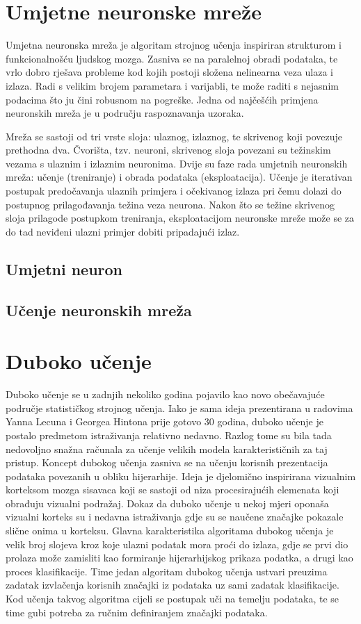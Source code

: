 \documentclass[lmodern, utf8, diplomski, numeric]{fer}
\begin{document}
  

\chapter{Umjetne neuronske mreže}

Umjetna neuronska mreža je algoritam strojnog učenja inspiriran strukturom i funkcionalnošću ljudskog mozga. Zasniva se na paralelnoj obradi podataka, te vrlo dobro rješava probleme kod kojih postoji složena nelinearna veza ulaza i izlaza. Radi s velikim brojem parametara i varijabli, te može raditi s nejasnim podacima što ju čini robusnom na pogreške. Jedna od najčešćih primjena neuronskih mreža je u području raspoznavanja uzoraka.

Mreža se sastoji od tri vrste sloja: ulaznog, izlaznog, te skrivenog koji povezuje prethodna dva. Čvorišta, tzv. neuroni, skrivenog sloja povezani su težinskim vezama s ulaznim i izlaznim neuronima. Dvije su faze rada umjetnih neuronskih mreža: učenje (treniranje) i obrada podataka (eksploatacija). Učenje je iterativan postupak predočavanja ulaznih primjera i očekivanog izlaza pri čemu dolazi do postupnog prilagođavanja težina veza neurona. Nakon što se težine skrivenog sloja prilagode postupkom treniranja, eksploatacijom neuronske mreže može se za do tad neviđeni ulazni primjer dobiti pripadajući izlaz.

\section{Umjetni neuron}
\section{Učenje neuronskih mreža}


\chapter{Duboko učenje}

Duboko učenje se u zadnjih nekoliko godina pojavilo kao novo obečavajuće područje statističkog strojnog učenja. Iako je sama ideja prezentirana u radovima Yanna Lecuna i Georgea Hintona prije gotovo 30 godina, duboko učenje je postalo predmetom istraživanja relativno nedavno. Razlog tome su bila tada nedovoljno snažna računala za učenje velikih modela karakterističnih za taj pristup. Koncept dubokog učenja zasniva se na učenju korisnih prezentacija podataka povezanih u obliku hijerarhije. Ideja je djelomično inspirirana vizualnim korteksom mozga sisavaca koji se sastoji od niza procesirajućih elemenata koji obrađuju vizualni podražaj. Dokaz da duboko učenje u nekoj mjeri oponaša vizualni korteks su i nedavna istraživanja gdje su se naučene značajke pokazale slične onima u korteksu. Glavna karakteristika algoritama dubokog učenja je velik broj slojeva kroz koje ulazni podatak mora proći do izlaza, gdje se prvi dio prolaza može zamisliti kao formiranje hijerarhijskog prikaza podatka, a drugi kao proces klasifikacije. Time jedan algoritam dubokog učenja ustvari preuzima zadatak izvlačenja korisnih značajki iz podataka uz sami zadatak klasifikacije. Kod učenja takvog algoritma cijeli se postupak uči na temelju podataka, te se time gubi potreba za ručnim definiranjem značajki podataka. 
\end{document}
